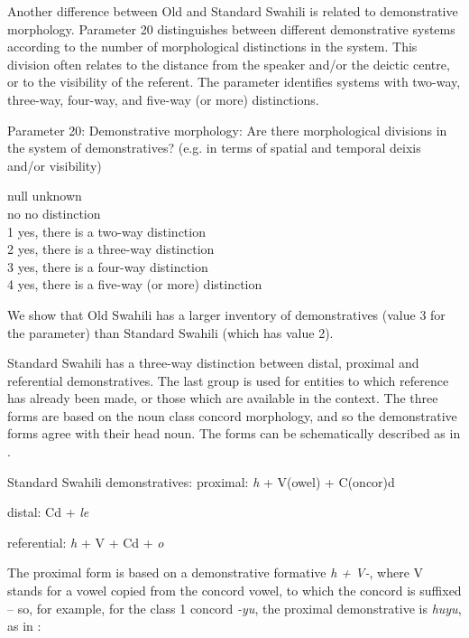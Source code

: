 \documentclass[output=paper]{langscibook}
\begin{document}
Another difference between Old and Standard Swahili is related to demonstrative morphology. Parameter 20 distinguishes between different demonstrative systems according to the number of morphological distinctions in the system. This division often relates to the distance from the speaker and/or the deictic centre, or to the visibility of the referent. The parameter identifies systems with two-way, three-way, four-way, and five-way (or more) distinctions. 

\ea\label{ex:marten:7}
Parameter 20: Demonstrative morphology: Are there morphological divisions in the system of demonstratives? (e.g. in terms of spatial and temporal deixis and/or visibility)

\gllllll null\hspace{1ex}    unknown\\
no      {no distinction}\\ 
1      {yes, there is a two-way distinction}\\ 
2       {yes, there is a three-way distinction}\\ 
3       {yes, there is a four-way distinction}\\ 
4      {yes, there is a five-way (or more) distinction}\\
\z

We show that Old Swahili has a larger inventory of demonstratives (value 3 for the parameter) than Standard Swahili (which has value 2). 

Standard Swahili has a three-way distinction between distal, proximal and referential demonstratives. The last group is used for entities to which reference has already been made, or those which are available in the context. The three forms are based on the noun class concord morphology, and so the demonstrative forms agree with their head noun. The forms can be schematically described as in  \citep[18]{Schadeberg1992}.

\ea\label{ex:marten:8}
Standard Swahili demonstratives: 
    \ea\label{ex:marten:8a}  proximal:   \textit{h} + V(owel) + C(oncor)d

    \ex\label{ex:marten:8b}   distal:     Cd + \textit{le}

    \ex\label{ex:marten:8c}  referential:   \textit{h} + V + Cd + \textit{o}
    \z
\z

The proximal form is based on a demonstrative formative \textit{h + V-}, where V stands for a vowel copied from the concord vowel, to which the concord is suffixed -- so, for example, for the class 1 concord \textit{{}-yu}, the proximal demonstrative is \textit{huyu}, as in :
\end{document}
